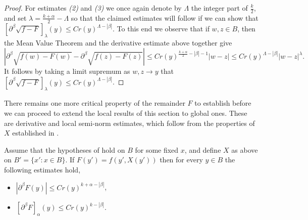 \documentclass[oneside,hidelinks,indentfirst,10pt]{book}
\begin{document}
\begin{proof}
For estimates \textit{(2)} and \textit{(3)} we once again denote by \(\Lambda\) the integer part of \(\frac{k}{2}\), and set \(\lambda=\frac{k+\alpha}{2}-\Lambda\) so that the claimed estimates will follow if we can show that \([\partial^\beta\sqrt{f-F}]_{\lambda}(y)\leq Cr(y)^{\Lambda-|\beta|}\). To this end we observe that if \(w,z\in B\), then the Mean Value Theorem and the derivative estimate above together give
\[
    |\partial^\beta\sqrt{f(w)-F(w)}-\partial^\beta\sqrt{f(z)-F(z)}|\leq Cr(y)^{\frac{k+\alpha}{2}-|\beta|-1}|w-z|\leq Cr(y)^{\Lambda-|\beta|}|w-z|^\lambda.
\]
It follows by taking a limit supremum as \(w,z\rightarrow y\) that \([\partial^\beta\sqrt{f-F}]_{\lambda}(y)\leq Cr(y)^{\Lambda-|\beta|}\).
\end{proof}


There remains one more critical property of the remainder \(F\) to establish before we can proceed to extend the local results of this section to global ones. These are derivative and local semi-norm estimates, which follow from the properties of \(X\) established in .

\begin{lem}\label{lem:implicitest}
Assume that the hypotheses of  hold on \(B\) for some fixed \(x\), and define \(X\) as above on \(B'=\{x':x\in B\}\). If \(F(y')=f(y',X(y'))\) then for every \(y\in B\) the following estimates hold, 
\begin{itemize}
    \item[(1)] \(|\partial^\beta F(y)|\leq Cr(y)^{k+\alpha-|\beta|}\),
    \item[(2)] \([\partial^\beta F]_{\alpha}(y)\leq Cr(y)^{k-|\beta|}\).
\end{itemize}
\end{lem}
\end{document}
